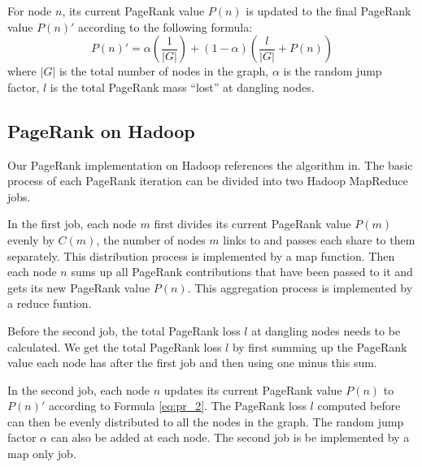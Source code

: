 \documentclass[12pt,conference,letterpaper]{IEEEtran}
\begin{document}

For node $n$, its current PageRank value $P(n)$ is updated to the final PageRank value $P(n)'$ according to the following formula:
\begin{equation}
P(n)' = \alpha (\frac{1}{|G|}) + (1 - \alpha) (\frac{l}{|G|} + P(n)) \label{eq:pr_2}
\end{equation}
where $|G|$ is the total number of nodes in the graph, $\alpha$ is the random jump factor, $l$ is the total PageRank mass ``lost'' at dangling nodes.


\subsection{PageRank on Hadoop}
Our PageRank implementation on Hadoop references the algorithm in\cite{jimmy2010}. The basic process of each PageRank iteration can be divided into two Hadoop MapReduce jobs.

In the first job, each node $m$ first divides its current PageRank value $P(m)$ evenly by $C(m)$, the number of nodes $m$ links to and passes each share to them separately. This distribution process is implemented by a map function. Then each node $n$ sums up all PageRank contributions that have been passed to it and gets its new PageRank value $P(n)$. This aggregation process is implemented by a reduce funtion.

Before the second job, the total PageRank loss $l$ at dangling nodes needs to be calculated. We get the total PageRank loss $l$ by first summing up the PageRank value each node has after the first job and then using one minus this sum.

In the second job, each node $n$ updates its current PageRank value $P(n)$ to $P(n)'$ according to Formula \ref{eq:pr_2}. The PageRank loss $l$ computed before can then be evenly distributed to all the nodes in the graph. The random jump factor $\alpha$ can also be added at each node. The second job is be implemented by a map only job. 
\end{document}
